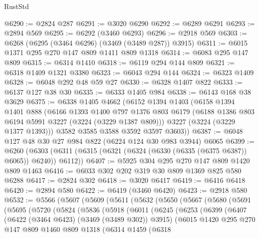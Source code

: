 \begin{lexlean}{RustStd}
\begin{coremodule}
@6290 := @2824 @287
@6291 := @3020 @6290
@6292 := @6289 @6291
@6293 := @2894 @569
@6295 := @6292 (@3460 @6293)
@6296 := @2918 @569
@6303 := @6268 (@6295 (@3464 @6296) (@3469 (@3489 @287)) @3915)
@6311 := @6015 @1371 @295 @270 @147 @809 @1411 @809 @1318
@6314 := @6083 @295 @147 @809
@6315 := @6314 @1410
@6318 := @6119 @294 @144 @809
@6321 := @6318 @1409 @1321 @3380
@6323 := @6043 @294 @144
@6324 := @6323 @1409
@6328 := @6048 @292 @48 @59 @27
@6330 := @6328 @1407 @822
@6333 := @6137 @127 @38 @30
@6335 := @6333 @1405 @984
@6338 := @6143 @168 @38 @3629
@6375 := @6338
    @1405
    @4662
    (@6152
      @1394
      @1403
      (@6158
        @1394
        @1401
        @888
        (@6166
          @1393
          @1400
          @797
          @1376
          @803
          @6179
          (@6188 @1386 @803 @6194 @5991 @3227 (@3224 (@3229 @1387 @809)))
          @3227
          (@3224 (@3229 @1377 @1393)))
        @3582
        @3585
        @3588
        @3592
        @3597
        @3603))
@6387 := @6048 @127 @48 @30 @27 @984 @822 (@6224 @124 @30 @983 @3944) @6065
@6399 := @6260
    (@6303 (@6311 (@6315 (@6321 (@6324 (@6330 (@6335 (@6375 @6387)) @6065)) @6240)) @6112))
@6407 := @5925 @304 @295 @270 @147 @809 @1420 @809 @1463
@6416 := @6033 @302 @202 @319 @30 @809 @1369 @825 @580 @6288
@6417 := @2824 @302
@6418 := @3020 @6417
@6419 := @6416 @6418
@6420 := @2894 @580
@6422 := @6419 (@3460 @6420)
@6423 := @2918 @580
@6532 := @5566
    (@5607
      (@5609
        (@5611
          (@5632
            (@5650
              (@5667
                (@5680
                  (@5691
                    (@5695
                      (@5720
                        (@5824
                          (@5836
                            (@5918
                              (@6011
                                (@6245
                                  (@6253
                                    (@6399
                                      (@6407
                                        (@6422 (@3464 @6423) (@3469 (@3489 @302)) @3915)
                                        (@6015
                                          @1420
                                          @295
                                          @270
                                          @147
                                          @809
                                          @1460
                                          @809
                                          @1318
                                          (@6314
                                            @1459
                                            (@6318

\end{coremodule}
\end{lexlean}
